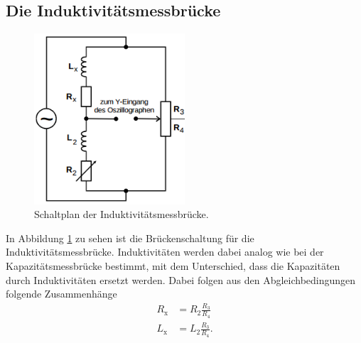 \documentclass[
  bibliography=totoc,     %
  captions=tableheading,  %
  titlepage=firstiscover, %
]{scrartcl}
\begin{document}
\subsection{Die Induktivitätsmessbrücke}
\begin{figure}[htb]
  \centering
  \includegraphics[width=0.5\textwidth]{V3024.png}
  \caption{Schaltplan der Induktivitätsmessbrücke. \cite{anleitung}}
  \label{fig:V3024}
\end{figure}
In Abbildung \ref{fig:V3024} zu sehen ist die Brückenschaltung für die
Induktivitätsmessbrücke. Induktivitäten werden dabei analog wie bei der
Kapazitätsmessbrücke bestimmt, mit dem Unterschied, dass die Kapazitäten
durch Induktivitäten ersetzt werden. Dabei folgen aus den Abgleichbedingungen
folgende Zusammenhänge
\begin{align}
    \label{eqn:induktivitätsmessbrücke_R}
    R_{\mathup{x}} &= R_2 \frac{R_3}{R_4} \\
    \label{eqn:induktivitätsmessbrücke_L}
    L_{\mathup{x}} &= L_2 \frac{R_3}{R_4}.
\end{align}
\newpage
\end{document}
